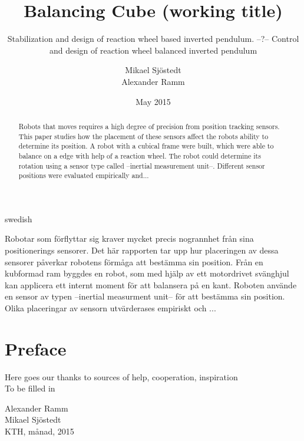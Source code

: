 \documentclass[a4paper,11pt]{kth-mag}
\title{Balancing Cube (working title)}
\subtitle{Stabilization and design of reaction wheel based inverted pendulum. --?-- Control and design of reaction wheel balanced inverted pendulum}
\author{Mikael Sjöstedt \\ Alexander Ramm}
\date{May 2015}
\begin{document}
%
\clearpage

\frontmatter
\pagestyle{plain}
{}
\maketitle
{}
\begin{abstract}
Robots that moves requires a high degree of precision from position tracking sensors. This paper studies how the 
placement of these sensors affect the robots ability to determine its position. A robot with a cubical frame were 
built, which were able to balance on a edge with help of a reaction wheel. The robot could determine its rotation using a sensor type called --inertial measurement unit--. Different sensor positions were evaluated empirically and...
 
\end{abstract}
\cleardoublepage
\begin{foreignabstract}{swedish}
Robotar som förflyttar sig kraver mycket precis nogrannhet från sina positionerings sensorer. Det här rapporten tar
upp hur placeringen av dessa sensorer påverkar robotens förmåga att bestämma sin position. Från en kubformad ram 
byggdes en robot, som med hjälp av ett motordrivet svänghjul kan applicera ett internt moment för att balansera på en kant. Roboten använde en sensor av typen --inertial measurment unit-- för att bestämma sin position. Olika placeringar av sensorn utvärderases empiriskt och ...
\\


\end{foreignabstract}
\clearpage
\chapter*{Preface}
Here goes our thanks to sources of  help, cooperation, inspiration \\ To be filled in \\
\begin{flushright}Alexander Ramm \\Mikael Sjöstedt \\ KTH, månad, 2015 \end{flushright}
\end{document}
